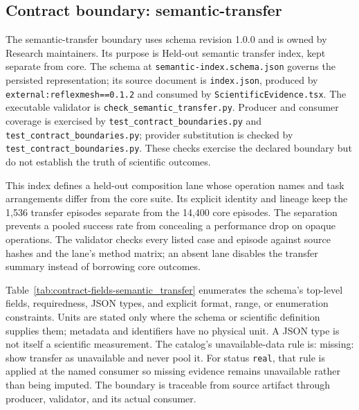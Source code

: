 \subsection{Contract boundary: semantic-transfer}\label{sec:contract-semantic_transfer}
The semantic-transfer boundary uses schema revision 1.0.0 and is owned by Research maintainers. Its purpose is Held-out semantic transfer index, kept separate from core. The schema at \texttt{semantic-index.schema.json} governs the persisted representation; its source document is \texttt{index.json}, produced by \texttt{external:reflexmesh==0.1.2} and consumed by \texttt{Scientific\allowbreak{}Evidence.tsx}. The executable validator is \texttt{check\_\allowbreak{}semantic\_\allowbreak{}transfer.py}. Producer and consumer coverage is exercised by \texttt{test\_\allowbreak{}contract\_\allowbreak{}boundaries.py} and \texttt{test\_\allowbreak{}contract\_\allowbreak{}boundaries.py}; provider substitution is checked by \texttt{test\_\allowbreak{}contract\_\allowbreak{}boundaries.py}. These checks exercise the declared boundary but do not establish the truth of scientific outcomes.

This index defines a held-out composition lane whose operation names and task arrangements differ from the core suite. Its explicit identity and lineage keep the 1,536 transfer episodes separate from the 14,400 core episodes. The separation prevents a pooled success rate from concealing a performance drop on opaque operations. The validator checks every listed case and episode against source hashes and the lane's method matrix; an absent lane disables the transfer summary instead of borrowing core outcomes.

Table~\ref{tab:contract-fields-semantic_transfer} enumerates the schema's top-level fields, requiredness, JSON types, and explicit format, range, or enumeration constraints. Units are stated only where the schema or scientific definition supplies them; metadata and identifiers have no physical unit. A JSON type is not itself a scientific measurement. The catalog's unavailable-data rule is: missing: show transfer as unavailable and never pool it. For status \texttt{real}, that rule is applied at the named consumer so missing evidence remains unavailable rather than being imputed. The boundary is traceable from source artifact through producer, validator, and its actual consumer.

